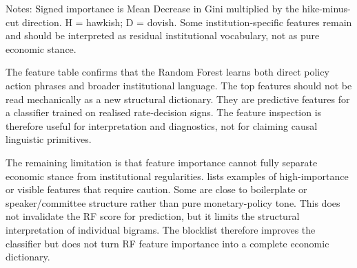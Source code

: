 \begin{table}[H]
\begin{threeparttable}
\begin{tablenotes}[flushleft]
\footnotesize
\item Notes: Signed importance is Mean Decrease in Gini multiplied by the
hike-minus-cut direction. H = hawkish; D = dovish. Some institution-specific
features remain and should be interpreted as residual institutional vocabulary,
not as pure economic stance.
\end{tablenotes}
\end{threeparttable}
\end{table}



The feature table confirms that the Random Forest learns both direct policy
action phrases and broader institutional language. The top features should not
be read mechanically as a new structural dictionary. They are predictive
features for a classifier trained on realised rate-decision signs. The feature
inspection is therefore useful for interpretation and diagnostics, not for
claiming causal linguistic primitives.

The remaining limitation is that feature importance cannot fully separate
economic stance from institutional regularities. 
lists examples of high-importance or visible features that require caution.
Some are close to boilerplate or speaker/committee structure rather than pure
monetary-policy tone. This does not invalidate the RF score for prediction, but
it limits the structural interpretation of individual bigrams. The blocklist
therefore improves the classifier but does not turn RF feature importance into
a complete economic dictionary.


